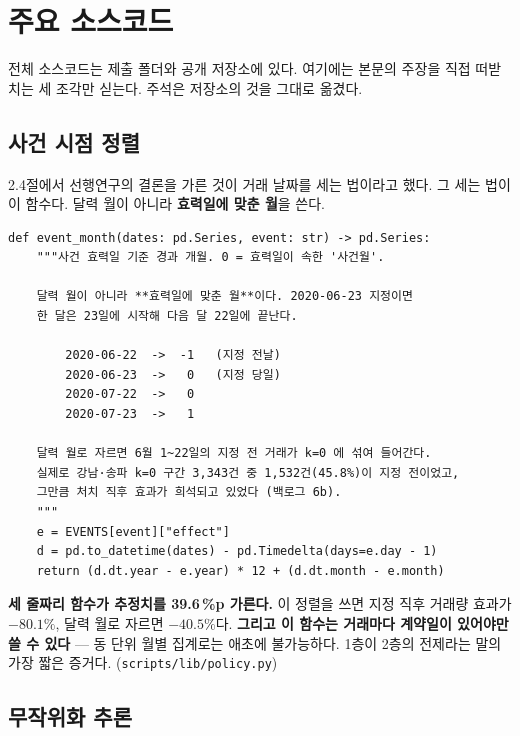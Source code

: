 
\section{주요 소스코드}

전체 소스코드는 제출 폴더와 공개 저장소에 있다\citep{repo}. 여기에는 본문의
주장을 직접 떠받치는 세 조각만 싣는다. 주석은 저장소의 것을 그대로 옮겼다.

\subsection{사건 시점 정렬}

2.4절에서 선행연구의 결론을 가른 것이 거래 날짜를 세는 법이라고 했다. 그 세는
법이 이 함수다. 달력 월이 아니라 \textbf{효력일에 맞춘 월}을 쓴다.

\begin{footnotesize}
\begin{verbatim}
def event_month(dates: pd.Series, event: str) -> pd.Series:
    """사건 효력일 기준 경과 개월. 0 = 효력일이 속한 '사건월'.

    달력 월이 아니라 **효력일에 맞춘 월**이다. 2020-06-23 지정이면
    한 달은 23일에 시작해 다음 달 22일에 끝난다.

        2020-06-22  ->  -1   (지정 전날)
        2020-06-23  ->   0   (지정 당일)
        2020-07-22  ->   0
        2020-07-23  ->   1

    달력 월로 자르면 6월 1~22일의 지정 전 거래가 k=0 에 섞여 들어간다.
    실제로 강남·송파 k=0 구간 3,343건 중 1,532건(45.8%)이 지정 전이었고,
    그만큼 처치 직후 효과가 희석되고 있었다 (백로그 6b).
    """
    e = EVENTS[event]["effect"]
    d = pd.to_datetime(dates) - pd.Timedelta(days=e.day - 1)
    return (d.dt.year - e.year) * 12 + (d.dt.month - e.month)
\end{verbatim}
\end{footnotesize}

\textbf{세 줄짜리 함수가 추정치를 39.6\,\%p 가른다.} 이 정렬을 쓰면 지정 직후
거래량 효과가 $-80.1\%$, 달력 월로 자르면 $-40.5\%$다. \textbf{그리고 이
함수는 거래마다 계약일이 있어야만 쓸 수 있다} --- 동 단위 월별 집계로는
애초에 불가능하다. 1층이 2층의 전제라는 말의 가장 짧은 증거다.
(\texttt{scripts/lib/policy.py})

\subsection{무작위화 추론}

